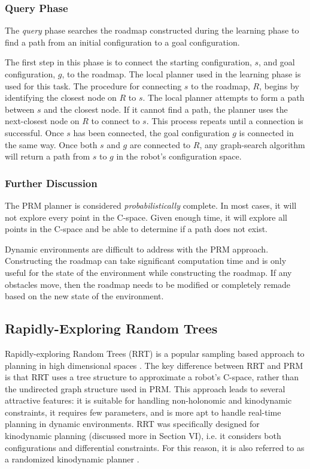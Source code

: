 \documentclass[10pt,conference]{ieeeconf}
\begin{document}
\subsubsection{Query Phase}

The \emph{query} phase searches the roadmap constructed during the learning phase to find a path from an initial configuration to a goal configuration. 

The first step in this phase is to connect the starting configuration, $s$, and goal configuration, $g$, to the roadmap. The local planner used in the learning phase is used for this task. The procedure for connecting $s$ to the roadmap, $R$, begins by identifying the closest node on $R$ to $s$. The local planner attempts to form a path between $s$ and the closest node. If it cannot find a path, the planner uses the next-closest node on $R$ to connect to $s$. This process repeats until a connection is successful. Once $s$ has been connected, the goal configuration $g$ is connected in the same way. Once both $s$ and $g$ are connected to $R$, any graph-search algorithm will return a path from $s$ to $g$ in the robot's configuration space.

\subsubsection{Further Discussion}

The PRM planner is considered \emph{probabilistically} complete. In most cases, it will not explore every point in the C-space. Given enough time, it will explore all points in the C-space and be able to determine if a path does not exist. 

Dynamic environments are difficult to address with the PRM approach. Constructing the roadmap can take significant computation time and is only useful for the state of the environment while constructing the roadmap. If any obstacles move, then the roadmap needs to be modified or completely remade based on the new state of the environment.


\subsection{Rapidly-Exploring Random Trees}

Rapidly-exploring Random Trees (RRT) is a popular sampling based approach to planning in high dimensional spaces \cite{RRT}. The key difference between RRT and PRM is that RRT uses a tree structure to approximate a robot's C-space, rather than the undirected graph structure used in PRM. This approach leads to several attractive features: it is suitable for handling non-holonomic and kinodynamic constraints, it requires few parameters, and is more apt to handle real-time planning in dynamic environments. RRT was specifically designed for kinodynamic planning (discussed more in Section VI), i.e. it considers both configurations and differential constraints. For this reason, it is also referred to as a randomized kinodynamic planner \cite{lavalle2001randomized}.  
\end{document}
